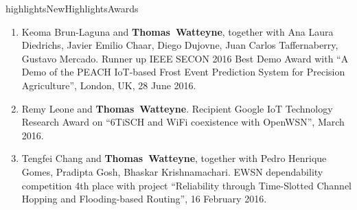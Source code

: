 \documentclass{ra2016}
\newcommand{\thomas}           {\textbf{Thomas~Watteyne}}
\begin{document}
\begin{module}{highlights}{NewHighlights}{Awards}

\begin{enumerate}
    \item Keoma Brun-Laguna and \thomas, together with Ana Laura Diedrichs,  Javier Emilio Chaar, Diego Dujovne, Juan Carlos Taffernaberry, Gustavo Mercado. Runner up IEEE SECON 2016 Best Demo Award with ``A Demo of the PEACH IoT-based Frost Event Prediction System for Precision Agriculture'', London, UK, 28 June 2016.
    \item Remy Leone and \thomas. Recipient Google IoT Technology Research Award on ``6TiSCH and WiFi coexistence with OpenWSN'', March 2016.
    \item Tengfei Chang and \thomas, together with Pedro Henrique Gomes, Pradipta Gosh, Bhaskar Krishnamachari. EWSN dependability competition 4th place with project ``Reliability through Time-Slotted Channel Hopping and Flooding-based Routing'', 16 February 2016.
\end{enumerate}

\end{module}
\end{document}
